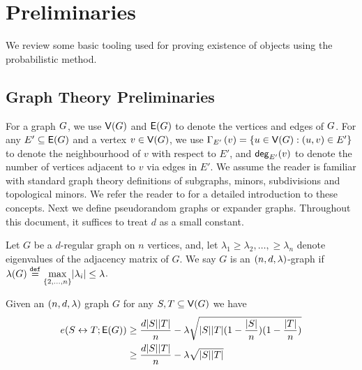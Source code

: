 \documentclass[11pt]{article}
\begin{document}
\section{Preliminaries}
\label{sec:prelims}

We review some basic tooling used for proving existence of objects using the probabilistic method.




\subsection{Graph Theory Preliminaries}
\label{sec:graph-theory-prelims}

For a graph $G$, we use $\mathsf{V}(G)$ and $\mathsf{E}(G)$ to denote the vertices and edges of $G$. 
For any $E' \subseteq \mathsf{E}(G)$ and a vertex $v \in \mathsf{V}(G)$, we use $\Gamma_{E'}\left(v\right) = \{ u \in \mathsf{V}(G) : (u,v) \in E' \}$ to denote the neighbourhood of $v$ with respect to $E'$, and $\mathsf{deg}_{E'}(v)$ to denote the number of vertices adjacent to $v$ via edges in $E'$.
We assume the reader is familiar with standard graph theory definitions of subgraphs, minors, subdivisions and  topological minors.
We refer the reader to \citep{bollobas2012graph} for a detailed introduction to these concepts.
Next we define pseudorandom graphs or expander graphs. 
Throughout this document, it suffices to treat $d$ as a small constant.

\begin{definition}\label{def:expander-graphs}
Let $G$ be a $d$-regular graph on $n$ vertices, and, let $\lambda_1 \geq \lambda_2, \dots, \geq \lambda_n$ denote eigenvalues of the adjacency matrix of $G$.
We say $G$ is an $(n, d, \lambda)$-graph if $\lambda(G) \text{}\overset{\mathtt{def}}{=} \underset{{\{2, \dots, n\}}}{\max}|\lambda_i| \leq \lambda$.
\end{definition}


\begin{lemma}\label{lemma:expanders-mixing-lemma}
  Given an $(n, d, \lambda)$ graph $G$ for any $S, T \subseteq \mathsf{V}(G)$ we have
\begin{align*}
  e(S \leftrightarrow T; \mathsf{E}(G)) &\geq \frac{d|S||T|}{n} - \lambda\sqrt{|S||T| (1 - \frac{|S|}{n}) (1 - \frac{|T|}{n})   }	\\
  &\geq \frac{d|S||T|}{n} - \lambda\sqrt{|S||T| }
\end{align*}
  
\end{lemma}
\end{document}
